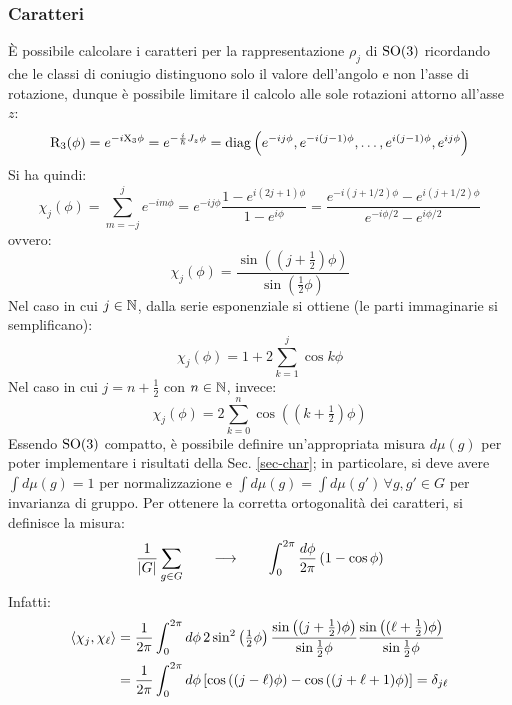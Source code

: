 \subsubsection{Caratteri}

È possibile calcolare i caratteri per la rappresentazione $ \rho_j $ di $ \mathrm{SO}(3) $ ricordando che le classi di coniugio distinguono solo il valore dell'angolo e non l'asse di rotazione, dunque è possibile limitare il calcolo alle sole rotazioni attorno all'asse $ z $:
\begin{equation*}
	\mathrm{R}_3(\phi) = e^{-i \mathrm{X}_3 \phi} = e^{- \frac{i}{\hbar} J_z \phi} = \operatorname{diag} \left( e^{-ij\phi}, e^{-i (j - 1) \phi}, \dots, e^{i (j - 1) \phi}, e^{i j \phi} \right)
\end{equation*}
Si ha quindi:
\begin{equation*}
	\chi_j(\phi) = \sum_{m = -j}^{j} e^{-im\phi} = e^{-ij\phi} \frac{1 - e^{i (2j + 1) \phi}}{1 - e^{i \phi}} = \frac{e^{-i (j + 1/2) \phi} - e^{i (j + 1/2) \phi}}{e^{-i \phi / 2} - e^{i \phi / 2}}
\end{equation*}
ovvero:
\begin{equation}
	\chi_j(\phi) = \frac{\sin \left( (j + \frac{1}{2}) \phi \right)}{\sin \left( \frac{1}{2} \phi \right)}
	\label{eq:9.24}
\end{equation}
Nel caso in cui $ j \in \mathbb{N} $, dalla serie esponenziale si ottiene (le parti immaginarie si semplificano):
\begin{equation}
	\chi_j(\phi) = 1 + 2 \sum_{k = 1}^{j} \cos k \phi
	\label{eq:9.25}
\end{equation}
Nel caso in cui $ j = n + \frac{1}{2} $ con $ n \in \mathbb{N} $, invece:
\begin{equation}
	\chi_j(\phi) = 2 \sum_{k = 0}^{n} \cos \left( (k + \tfrac{1}{2}) \phi \right)
	\label{eq:9.26}
\end{equation}
Essendo $ \mathrm{SO}(3) $ compatto, è possibile definire un'appropriata misura $ d\mu(g) $ per poter implementare i risultati della Sec. \ref{sec-char}; in particolare, si deve avere $ \int d\mu(g) = 1 $ per normalizzazione e $ \int d\mu(g) = \int d\mu(g') \,\forall g,g' \in G $ per invarianza di gruppo. Per ottenere la corretta ortogonalità dei caratteri, si definisce la misura:
\begin{equation*}
	\frac{1}{\left\lvert G\right\rvert} \sum_{g \in G} \qquad \longrightarrow \qquad \int_0^{2\pi} \frac{d\phi}{2\pi} \left( 1 - \cos \phi \right)
\end{equation*}
Infatti:
\begin{equation*}
	\begin{split}
		\braket{\chi_j, \chi_{\ell}}
		&= \frac{1}{2\pi} \int_0^{2\pi} d\phi\, 2\sin^2 \left( \tfrac{1}{2} \phi \right) \frac{\sin \left( (j + \frac{1}{2}) \phi \right)}{\sin \frac{1}{2} \phi} \frac{\sin \left( (\ell + \frac{1}{2}) \phi \right)}{\sin \frac{1}{2} \phi} \\
		&= \frac{1}{2\pi} \int_0^{2\pi} d\phi \left[ \cos \left( (j - \ell) \phi \right) - \cos \left( (j + \ell + 1) \phi \right) \right] = \delta_{j\ell}
	\end{split}
\end{equation*}

